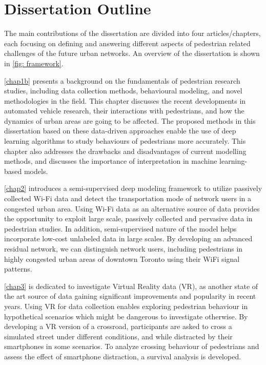 \section{Dissertation Outline}
\label{chap1:sec2}




 The main contributions of the dissertation are divided into four articles/chapters, each focusing on defining and answering different aspects of pedestrian related challenges of the future urban networks. An overview of the dissertation is shown in \cref{fig: framework}.


\cref{chap1b} presents a background on the fundamentals of pedestrian research studies, including data collection methods, behavioural modeling, and novel methodologies in the field.
This chapter discusses the recent developments in automated vehicle research, their interactions with pedestrians, and how the dynamics of urban areas are going to be affected.
The proposed methods in this dissertation based on these data-driven approaches enable the use of deep learning algorithms to study behaviours of pedestrians more accurately.
This chapter also addresses the drawbacks and disadvantages of current modelling methods, and discusses the importance of interpretation in machine learning-based models.


\cref{chap2} introduces a semi-supervised deep modeling framework to utilize passively collected Wi-Fi data and detect the transportation mode of network users in a congested urban area. Using Wi-Fi data as an alternative source of data provides the opportunity to exploit large scale, passively collected and pervasive data in pedestrian studies. In addition, semi-supervised nature of the model helps incorporate low-cost unlabeled data in large scales. By developing an advanced residual network, we can distinguish network users, including pedestrians in highly congested urban areas of downtown Toronto using their WiFi signal patterns.

\cref{chap3} is dedicated to investigate Virtual Reality data (VR), as another state of the art source of data gaining significant improvements and popularity in recent years. Using VR for data collection enables exploring pedestrian behaviour in hypothetical scenarios which might be dangerous to investigate otherwise. By developing a VR version of a crossroad, participants are asked to cross a simulated street under different conditions, and while distracted by their smartphones in some scenarios. To analyze crossing behaviour of pedestrians and assess the effect of smartphone distraction, a survival analysis is developed.

